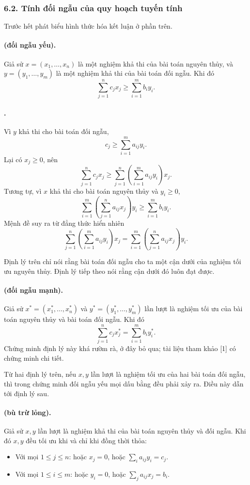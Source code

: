 \documentclass[11pt]{article}
\begin{document}
\subsubsection*{6.2. Tính đối ngẫu của quy hoạch tuyến tính}

Trước hết phát biểu hình thức hóa kết luận ở phần trên.

\paragraph{ (đối ngẫu yếu).}
Giả sử \(x=(x_1,\ldots,x_n)\) là một nghiệm khả thi của bài toán nguyên thủy,
và \(y=(y_1,\ldots,y_m)\) là một nghiệm khả thi của bài toán đối ngẫu. Khi đó
\[
  \sum_{j=1}^{n}c_jx_j\ge \sum_{i=1}^{m}b_iy_i.
\]

\paragraph{.}
Vì \(y\) khả thi cho bài toán đối ngẫu,
\[
  c_j\ge \sum_{i=1}^{m}a_{ij}y_i.
\]
Lại có \(x_j\ge 0\), nên
\[
  \sum_{j=1}^{n}c_jx_j
  \ge \sum_{j=1}^{n}\left(\sum_{i=1}^{m}a_{ij}y_i\right)x_j.
\]
Tương tự, vì \(x\) khả thi cho bài toán nguyên thủy và \(y_i\ge 0\),
\[
  \sum_{i=1}^{m}\left(\sum_{j=1}^{n}a_{ij}x_j\right)y_i
  \ge \sum_{i=1}^{m}b_iy_i.
\]
Mệnh đề suy ra từ đẳng thức hiển nhiên
\[
  \sum_{j=1}^{n}\left(\sum_{i=1}^{m}a_{ij}y_i\right)x_j
  =
  \sum_{i=1}^{m}\left(\sum_{j=1}^{n}a_{ij}x_j\right)y_i.
\]

Định lý trên chỉ nói rằng bài toán đối ngẫu cho ta một cận dưới của nghiệm
tối ưu nguyên thủy. Định lý tiếp theo nói rằng cận dưới đó luôn đạt được.

\paragraph{ (đối ngẫu mạnh).}
Giả sử \(x^*=(x_1^*,\ldots,x_n^*)\) và
\(y^*=(y_1^*,\ldots,y_m^*)\) lần lượt là nghiệm tối ưu của bài toán nguyên
thủy và bài toán đối ngẫu. Khi đó
\[
  \sum_{j=1}^{n}c_jx_j^*
  =
  \sum_{i=1}^{m}b_iy_i^*.
\]
Chứng minh định lý này khá rườm rà, ở đây bỏ qua; tài liệu tham khảo [1] có
chứng minh chi tiết.

Từ hai định lý trên, nếu \(x,y\) lần lượt là nghiệm tối ưu của hai bài toán
đối ngẫu, thì trong chứng minh đối ngẫu yếu mọi dấu bằng đều phải xảy ra. Điều
này dẫn tới định lý sau.

\paragraph{ (bù trừ lỏng).}
Giả sử \(x,y\) lần lượt là nghiệm khả thi của bài toán nguyên thủy và đối
ngẫu. Khi đó \(x,y\) đều tối ưu khi và chỉ khi đồng thời thỏa:
\begin{itemize}
  \item Với mọi \(1\le j\le n\): hoặc \(x_j=0\), hoặc
  \(\sum_i a_{ij}y_i=c_j\).
  \item Với mọi \(1\le i\le m\): hoặc \(y_i=0\), hoặc
  \(\sum_j a_{ij}x_j=b_i\).
\end{itemize}
\end{document}
